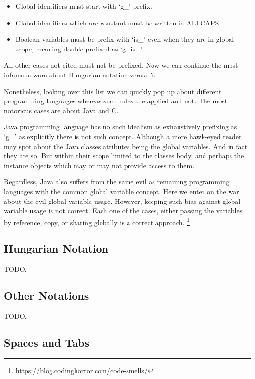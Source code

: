     \begin{itemize}
        \item Global identifiers must start with `g\_' prefix.
        \item Global identifiers which are constant must be written in ALLCAPS.
        \item Boolean variables must be prefix with `is\_' even when they are in
              global scope, meaning double prefixed as `g\_is\_'.
    \end{itemize}

    All other cases not cited must not be prefixed. Now we can continue the most
    infamous wars about Hungarian notation versus ?.

    Nonetheless, looking over this list we can quickly pop up about different
    programming languages whereas such rules are applied and not. The most
    notorious cases are about Java and C.

    Java programming language has no such idealism as exhaustively prefixing as
    `g\_' as explicitly there is not such concept. Although a more hawk-eyed
    reader may spot about the Java classes atributes being the global variables.
    And in fact they are so. But within their scope limited to the classes body,
    and perhaps the instance objects which may or may not provide access to
    them.

    Regardless, Java also suffers from the same evil as remaining programming
    languages with the common global variable concept. Here we enter on the
    war about the evil global variable usage. However, keeping such bias against
    global variable usage is not correct. Each one of the cases, either passing
    the variables by reference, copy, or sharing globally is a correct approach.
    \footnote{\url{https://blog.codinghorror.com/code-smells/}}


    \subsection{Hungarian Notation}

    TODO.


    \subsection{Other Notations}

    TODO.


    \subsection{Spaces and Tabs}

